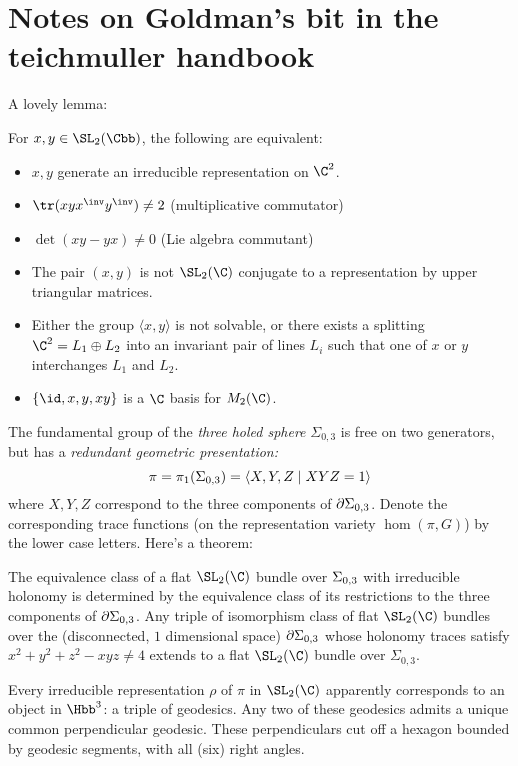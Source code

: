 \documentclass[11pt]{amsart}
\begin{document}
\section{Notes on Goldman's bit in the teichmuller handbook}
A lovely lemma:
\begin{lemma}
	For $x,y\in \SL_2(\Cbb)$, the following are equivalent: 
	\begin{itemize}
		\item $x,y$ generate an irreducible representation on $\C^2$. 
		\item $\tr(xyx^\inv y^\inv ) \neq 2$ (multiplicative commutator)
		\item $\det( xy -yx ) \neq 0$ (Lie algebra commutant)
		\item The pair $(x,y)$ is not $\SL_2(\C)$ conjugate to a representation by upper triangular matrices. 
		\item Either the group $\langle x,y\rangle$ is not solvable, or there exists a splitting $\C^2 = L_1 \oplus L_2$ into an invariant pair of lines $L_i$ such that one of $x$ or $y$ interchanges $L_1$ and $L_2$.
		\item $\{ \id , x , y , xy\}$ is a $\C$ basis for $M_2(\C)$. 
	\end{itemize}
\end{lemma}

The fundamental group of the \emph{three holed sphere} $\Sigma_{0,3}$ is free on two generators, but has a \emph{redundant geometric presentation:} 
\begin{equation*}
	\pi=\pi_1(\Sigma_{0,3})= \langle X,Y,Z \mid XYZ=1\rangle 
\end{equation*}
where $X,Y,Z$ correspond to the three components of $\partial \Sigma_{0,3}$. Denote the corresponding trace functions (on the representation variety $\hom (\pi,G)$) by the lower case letters. 
Here's a theorem: 
\begin{thm}
	The equivalence class of a flat $\SL_2(\C)$ bundle over $\Sigma_{0,3}$ with irreducible holonomy is determined by the equivalence class of its restrictions to the three components of $\partial \Sigma_{0,3}$. Any triple of isomorphism class of flat $\SL_2(\C)$ bundles over the (disconnected, $1$ dimensional space) $\partial \Sigma_{0,3}$ whose holonomy traces satisfy $x^2+y^2+z^2 -xyz \neq 4$ extends to a flat $\SL_2(\C)$ bundle over $\Sigma_{0,3}$. 
\end{thm}

Every irreducible representation $\rho$ of $\pi$ in $\SL_2(\C)$ apparently corresponds to an object in $\Hbb^3$: a triple of geodesics. Any two of these geodesics admits a unique common perpendicular geodesic.  These perpendiculars cut off a hexagon bounded by geodesic segments, with all (six) right angles. 
\end{document}
